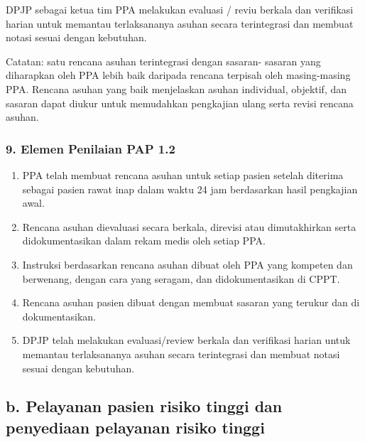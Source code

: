 \documentclass[
]{book}
\providecommand{\tightlist}{%
  \setlength{\itemsep}{0pt}\setlength{\parskip}{0pt}}
\begin{document}
DPJP sebagai ketua tim PPA melakukan evaluasi / reviu berkala dan verifikasi harian untuk memantau terlaksananya asuhan secara terintegrasi dan membuat notasi sesuai dengan kebutuhan.

Catatan: satu rencana asuhan terintegrasi dengan sasaran- sasaran yang diharapkan oleh PPA lebih baik daripada rencana terpisah oleh masing-masing PPA. Rencana asuhan yang baik menjelaskan asuhan individual, objektif, dan sasaran dapat diukur untuk memudahkan pengkajian ulang serta revisi rencana asuhan.

\hypertarget{elemen-penilaian-pap-1.2}{%
\subsubsection*{9. Elemen Penilaian PAP 1.2}\label{elemen-penilaian-pap-1.2}}

\begin{enumerate}
\def\labelenumi{\alph{enumi}.}
\tightlist
\item
  PPA telah membuat rencana asuhan untuk setiap pasien setelah diterima sebagai pasien rawat inap dalam waktu 24 jam berdasarkan hasil pengkajian awal.
\item
  Rencana asuhan dievaluasi secara berkala, direvisi atau dimutakhirkan serta didokumentasikan dalam rekam medis oleh setiap PPA.
\item
  Instruksi berdasarkan rencana asuhan dibuat oleh PPA yang kompeten dan berwenang, dengan cara yang seragam, dan didokumentasikan di CPPT.
\item
  Rencana asuhan pasien dibuat dengan membuat sasaran yang terukur dan di dokumentasikan.
\item
  DPJP telah melakukan evaluasi/review berkala dan verifikasi harian untuk memantau terlaksananya asuhan secara terintegrasi dan membuat notasi sesuai dengan kebutuhan.
\end{enumerate}

\hypertarget{b.-pelayanan-pasien-risiko-tinggi-dan-penyediaan-pelayanan-risiko-tinggi}{%
\subsection*{b. Pelayanan pasien risiko tinggi dan penyediaan pelayanan risiko tinggi}\label{b.-pelayanan-pasien-risiko-tinggi-dan-penyediaan-pelayanan-risiko-tinggi}}
\end{document}
